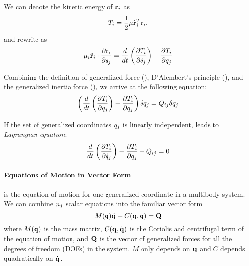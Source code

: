 We can denote the kinetic energy of $\mathbf{r}_i$ as
\begin{equation}\label{eq:kinetic_energy}
    T_i = \frac{1}{2} \mathbf{\mu} \dot{\mathbf{r}}_i^{T}
    \dot{\mathbf{r}}_i,
\end{equation}
and rewrite  as
\begin{equation}\label{eq:inertia_kinetic}
    \mathbf{\mu}_i \ddot{\mathbf{r}}_i \cdot \frac{\partial \mathbf{r}_i}{\partial
    q_j} = \frac{d}{dt} \left( \frac{\partial T_i}{\partial
    \dot{q}_j}\right) - \frac{\partial T_i}{\partial q_j}
\end{equation}

Combining the definition of generalized force (), D'Alembert's principle (), and the generalized inertia force (), we arrive at the following equation:
\begin{equation}\label{eq:dynamic_equil}
    \left ( \frac{d}{dt} \left( \frac{\partial T_i}{\partial \dot{q}_j} \right) - \frac{\partial T_i}{\partial
    q_j}\right ) \delta q_j = Q_{ij} \delta
    q_j
\end{equation}

If the set of generalized coordinates $q_j$ is linearly
independent,  leads to
\emph{Lagrangian equation}:
\begin{equation}\label{eq:lagrangian_dyn2}
    \frac{d}{dt} \left( \frac{\partial T_i}{\partial
    \dot{q}_j} \right) - \frac{\partial T_i}{\partial
    q_j} - Q_{ij} = 0
\end{equation}

\paragraph{Equations of Motion in Vector Form.}  is the equation of motion for one generalized coordinate in a
multibody system. We can combine $n_j$  scalar equations into
the familiar vector form
\begin{equation}\label{eq:lagrangian_vector}
M(\mathbf{q}) \ddot{\mathbf{q}} + C(\mathbf{q}, \dot{\mathbf{q}}) = \mathbf{Q} 
\end{equation}
where $M(\mathbf{q})$ is the mass matrix, $C(\mathbf{q}, \dot{\mathbf{q}})$ is the
Coriolis and centrifugal term of the equation of motion, and $\mathbf{Q}$
is the vector of generalized forces for all the degrees of freedom
(DOFs) in the system. $M$ only depends on $\mathbf{q}$ and $C$ depends
quadratically on $\dot{\mathbf{q}}$.

